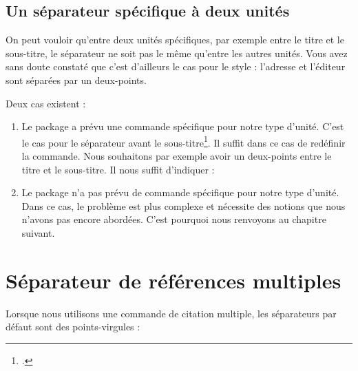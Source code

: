     \begin{latexcode}
\renewcommand{\newunitpunct}[0]{\addcomma\addspace}
    \end{latexcode}
    

    
\subsection{Un séparateur spécifique à deux unités}
    
    On peut vouloir qu'entre deux unités spécifiques, par exemple entre le titre et le sous-titre, le séparateur ne soit pas le même qu'entre les autres unités.    Vous avez sans doute constaté que c'est d'ailleurs le cas pour le style  : l'adresse et l'éditeur sont séparées par un deux-points.
    
    Deux cas existent :
        \begin{enumerate}
            \item Le package  a prévu une commande spécifique pour notre type d'unité. C'est le cas pour le séparateur avant le sous-titre\footcite[Ces commandes sont peu nombreuses : on les trouvera dans][]{biblatex_hooks}. Il suffit dans ce cas de redéfinir la commande. Nous souhaitons par exemple avoir un deux-points entre le titre et le sous-titre. Il nous suffit d'indiquer :
            
            \begin{latexcode}
\renewcommand{\subtitlepunct}[0]{\addspace\addcolon\addspace}
            \end{latexcode}

            
            \item Le package n'a pas prévu de commande spécifique pour notre type d'unité. Dans ce cas, le problème est plus complexe et nécessite des notions que nous n'avons pas encore abordées. C'est pourquoi nous renvoyons au  chapitre suivant.
        \end{enumerate}
        
\section{Séparateur de références multiples}\label{multicitedelim}

Lorsque nous utilisons une commande de citation multiple, les séparateurs par défaut sont des points-virgules :


\begin{latexcode}
\autocites{Saxer1980}{Junod1992}
\end{latexcode}

